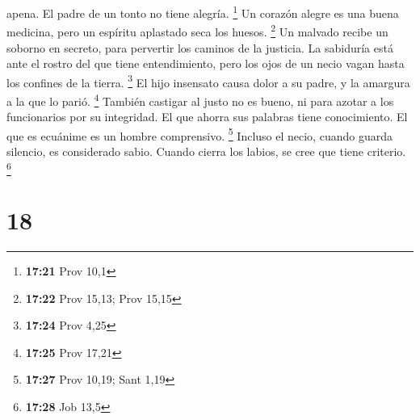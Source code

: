 apena. El padre de un tonto no tiene alegría. \footnote{\textbf{17:21}
  Prov 10,1}  Un corazón alegre es una buena medicina,
pero un espíritu aplastado seca los huesos. \footnote{\textbf{17:22}
  Prov 15,13; Prov 15,15}  Un malvado recibe un soborno
en secreto, para pervertir los caminos de la justicia. 
La sabiduría está ante el rostro del que tiene entendimiento, pero los
ojos de un necio vagan hasta los confines de la tierra. \footnote{\textbf{17:24}
  Prov 4,25}  El hijo insensato causa dolor a su padre, y
la amargura a la que lo parió. \footnote{\textbf{17:25} Prov 17,21}
 También castigar al justo no es bueno, ni para azotar a
los funcionarios por su integridad.  El que ahorra sus
palabras tiene conocimiento. El que es ecuánime es un hombre
comprensivo. \footnote{\textbf{17:27} Prov 10,19; Sant 1,19}
 Incluso el necio, cuando guarda silencio, es considerado
sabio. Cuando cierra los labios, se cree que tiene criterio. \footnote{\textbf{17:28}
  Job 13,5}

\hypertarget{section-17}{%
\section{18}\label{section-17}}

